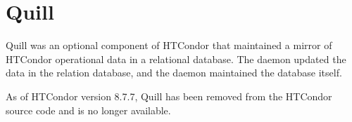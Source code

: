 \newcommand{\QuillMacroNI}[1]{\texttt{#1}}      %
\newcommand{\QuillMacro}[1]{\texttt{#1}  \index{Quill source code contrib configuration macro!\texttt{#1}}}  %
\section{\label{sec:Quill}Quill}
Quill was an optional component of HTCondor that maintained a mirror 
of HTCondor operational data
in a relational database.  The  daemon updated
the data in the relation database, and the  daemon
maintained the database itself.

As of HTCondor version 8.7.7, Quill has been removed from the HTCondor source
code and is no longer available. 
